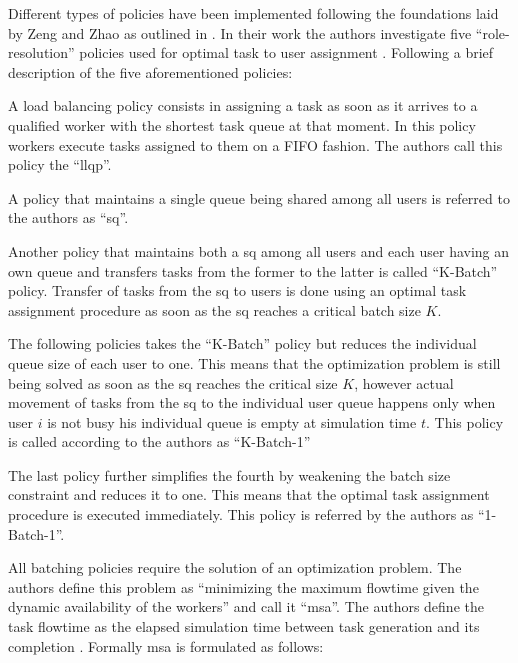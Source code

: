 \documentclass{seal_thesis}
\begin{document}
Different types of policies have been implemented following the foundations laid by Zeng and Zhao as outlined in . In their work the authors investigate five ``role-resolution'' policies used for optimal task to user assignment \cite[p. 7]{Zeng2005}. Following a brief description of the five aforementioned policies:
\begin{enumerate*}
	\item A load balancing policy consists in assigning a task as soon as it arrives to a qualified worker with the shortest task queue at that moment. In this policy workers execute tasks assigned to them on a FIFO fashion. The authors call this policy the ``\gls{llqp}''.
	\item A policy that maintains a single queue being shared among all users is referred to the authors as ``\gls{sq}''.
	\item Another policy that maintains both a \gls{sq} among all users and each user having an own queue and transfers tasks from the former to the latter is called ``K-Batch'' policy. Transfer of tasks from the \gls{sq} to users is done using an optimal task assignment procedure as soon as the \gls{sq} reaches a critical batch size $K$.
	\item The following policies takes the ``K-Batch'' policy but reduces the individual queue size of each user to one. This means that the optimization problem is still being solved as soon as the \gls{sq} reaches the critical size $K$, however actual movement of tasks from the \gls{sq} to the individual user queue happens only when user $i$ is not busy \ie his individual queue is empty at simulation time $t$. This policy is called according to the authors as ``K-Batch-1''
	\item The last policy further simplifies the fourth by weakening the batch size constraint and reduces it to one. This means that the optimal task assignment procedure is executed immediately. This policy is referred by the authors as ``1-Batch-1''.
\end{enumerate*}

All batching policies require the solution of an optimization problem. The authors define this problem as ``minimizing the maximum flowtime given the dynamic availability of the workers'' and call it ``\gls{msa}''\cite[p. 7]{Zeng2005}. The authors define the task flowtime as the elapsed simulation time between task generation and its completion \cite{Zeng2005,Baker1974}. Formally \gls{msa} is formulated as follows:
\end{document}
